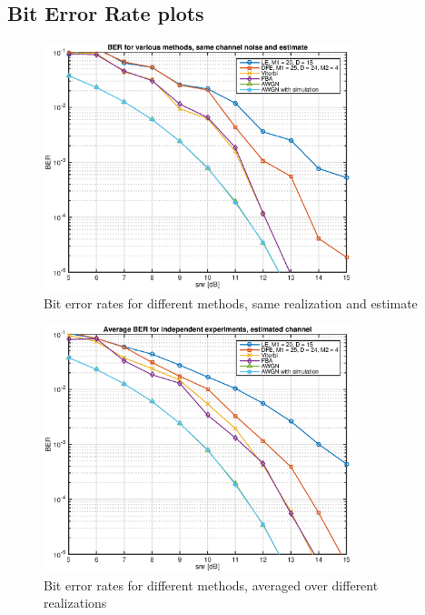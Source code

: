 \documentclass[10pt]{article}
\begin{document}

\subsection*{Bit Error Rate plots}

\begin{figure}[h!]
	\centering
	\includegraphics[width=0.8\textwidth]{BER_same_channel}
	\caption{Bit error rates for different methods, same realization and estimate}
	\label{fig:BER_same}
\end{figure}

\begin{figure}[h!]
	\centering
	\includegraphics[width=0.8\textwidth]{BER_average}
	\caption{Bit error rates for different methods, averaged over different realizations}
	\label{fig:BER_avg}
\end{figure}
\end{document}
